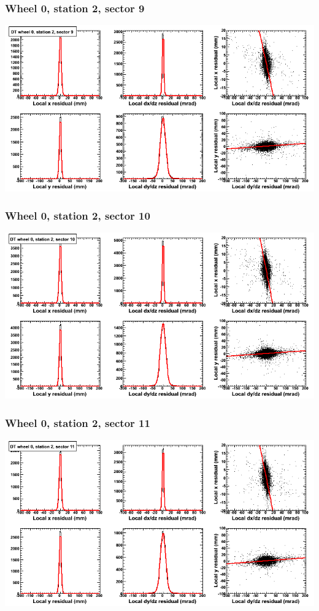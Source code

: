 \documentclass[compress]{beamer}
\begin{document}
\begin{frame}
\frametitle{Wheel 0, station 2, sector 9}
\includegraphics[width=\linewidth]{tmpbell_MBwhCst2sec09.png}
\end{frame}

\begin{frame}
\frametitle{Wheel 0, station 2, sector 10}
\includegraphics[width=\linewidth]{tmpbell_MBwhCst2sec10.png}
\end{frame}

\begin{frame}
\frametitle{Wheel 0, station 2, sector 11}
\includegraphics[width=\linewidth]{tmpbell_MBwhCst2sec11.png}
\end{frame}
\end{document}
